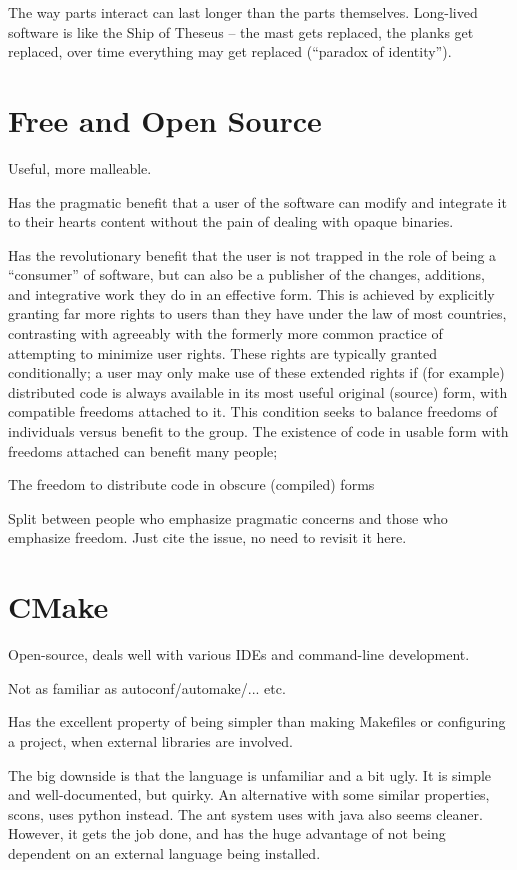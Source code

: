 The way parts interact can last longer than the parts themselves.
Long-lived software is like the Ship of Theseus -- the mast gets replaced,
the planks get replaced, over time everything may get replaced (``paradox
of identity'').


\section{Free and Open Source}

Useful, more malleable.

Has the pragmatic benefit that a user of the software can
modify and integrate it to their hearts content without the 
pain of dealing with opaque binaries.

Has the revolutionary benefit that the user is not trapped in the role
of being a ``consumer'' of software, but can also be a publisher of
the changes, additions, and integrative work they do in an effective
form.  This is achieved by explicitly granting far more rights to
users than they have under the law of most countries, contrasting with
agreeably with the formerly more common practice of attempting to
minimize user rights.  These rights are typically granted
conditionally; a user may only make use of these extended rights if
(for example) distributed code is always available in its most useful
original (source) form, with compatible freedoms attached to it.  This
condition seeks to balance freedoms of individuals versus benefit to
the group.  The existence of code in usable form with freedoms 
attached can benefit many people;

The freedom to distribute code in obscure (compiled) forms



Split between people who emphasize pragmatic concerns and those
who emphasize freedom.  Just cite the issue, no need to revisit
it here.


\section{CMake}

Open-source, deals well with various IDEs and command-line development.

Not as familiar as autoconf/automake/... etc.

Has the excellent property of being simpler than making Makefiles
or configuring a project, when external libraries are involved.

The big downside is that the language is unfamiliar and a bit ugly.
It is simple and well-documented, but quirky.  An alternative with
some similar properties, scons, uses python instead.  The ant system
uses with java also seems cleaner.  However, it gets the job
done, and has the huge advantage of not being dependent on an
external language being installed.

